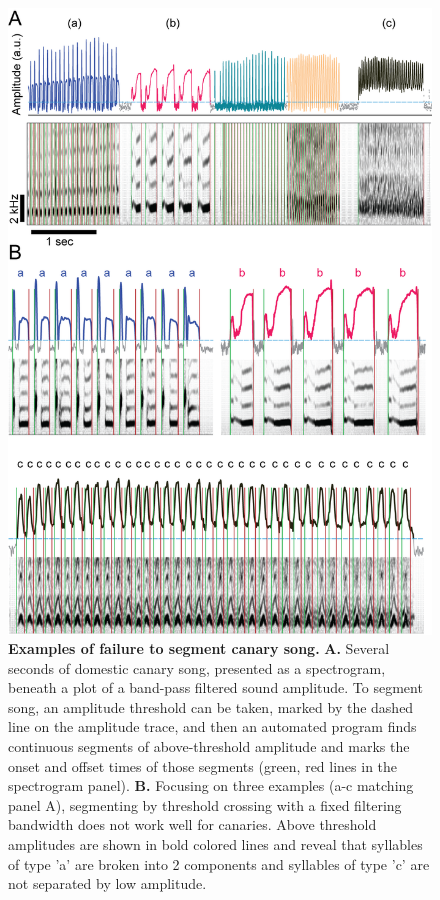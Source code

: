 \documentclass[10pt,letterpaper]{article}
\begin{document}
\begin{figure}[!h]
\includegraphics[scale=0.2]{Figures/fig2/fig2_v2.png}
\caption{{\bf Examples of failure to segment canary song.}
\textbf{A.} Several seconds of domestic canary song, presented as a spectrogram, beneath a plot of a band-pass filtered sound amplitude. To segment song, an amplitude threshold can be taken, marked by the dashed line on the amplitude trace, and then an automated program finds continuous segments of above-threshold amplitude and marks the onset and offset times of those segments (green, red lines in the spectrogram panel). 
\textbf{B.} Focusing on three examples (a-c matching panel A), segmenting by threshold crossing with a fixed filtering bandwidth does not work well for canaries.  Above threshold amplitudes are shown in bold colored lines and reveal that syllables of type 'a' are broken into 2 components and syllables of type 'c' are not separated by low amplitude.}
\label{fig2}
\end{figure} 
\end{document}
